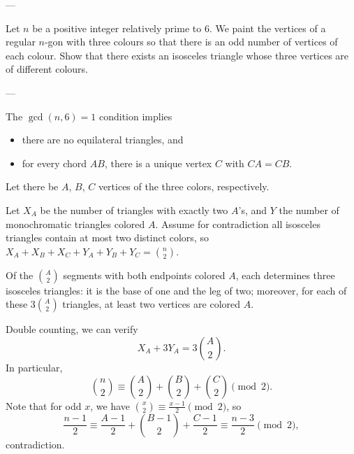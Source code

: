 
---

Let $n$ be a positive integer relatively prime to $6$. We paint the vertices of a regular $n$-gon with three colours so that there is an odd number of vertices of each colour. Show that there exists an isosceles triangle whose three vertices are of different colours.

---

The $\gcd(n,6)=1$ condition implies
\begin{itemize}[itemsep=0em]
    \item there are no equilateral triangles, and
    \item for every chord $AB$, there is a unique vertex $C$ with $CA=CB$.
\end{itemize}
Let there be $A$, $B$, $C$ vertices of the three colors, respectively.

Let $X_A$ be the number of triangles with exactly two $A$'s, and $Y$ the number of monochromatic triangles colored $A$. Assume for contradiction all isosceles triangles contain at most two distinct colors, so $X_A+X_B+X_C+Y_A+Y_B+Y_C=\binom n2$.

Of the $\binom A2$ segments with both endpoints colored $A$, each determines three isosceles triangles: it is the base of one and the leg of two; moreover, for each of these $3\binom A2$ triangles, at least two vertices are colored $A$.

Double counting, we can verify
\[X_A+3Y_A=3\binom A2.\]
In particular,
\[\binom n2\equiv\binom A2+\binom B2+\binom C2\pmod2.\]
Note that for odd $x$, we have $\binom x2\equiv\frac{x-1}2\pmod2$, so
\[\frac{n-1}2\equiv\frac{A-1}2+\binom{B-1}2+\frac{C-1}2\equiv\frac{n-3}2\pmod2,\]
contradiction.


